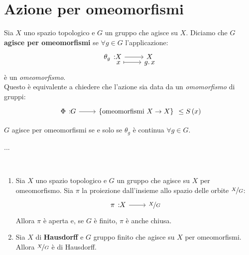 \section{Azione per omeomorfismi}
\begin{define}
Sia $X$ uno spazio topologico e $G$ un gruppo che agisce su $X$. Diciamo che $G$ \textbf{agisce per omeomorfismi} se $\forall g\in G$ l'applicazione:
\begin{equation}
\funztot{\theta_g}{X}{X}{x}{g\ldotp x}
\end{equation}
è un \textit{omeomorfismo}.\\
Questo è equivalente a chiedere che l'azione sia data da un \textit{omomorfismo} di gruppi:
\begin{equation}
\funz{\Phi}{G}{\left\{\text{omeomorfismi } X\rightarrow X\right\}}\leq S\left(x\right)
\end{equation}
\end{define}
\begin{exercise}
 $G$ agisce per omeomorfismi se e solo se $\theta_g$ è continua $\forall g\in G$.
\end{exercise}
\begin{demonstration}
	...
\end{demonstration}
\begin{proposition}~{}
\begin{enumerate}
\item Sia $X$ uno spazio topologico e $G$ un gruppo che agisce su $X$ per omeomorfismo. Sia $\pi$ la proiezione dall'insieme allo spazio delle orbite $\nicefrac{X}{G}$:
	\begin{equation}
		\funz{\pi}{X}{\nicefrac{X}{G}}
	\end{equation}
Allora $\pi$ è aperta e, se $G$ è finito, $\pi$ è anche chiusa.
\item Sia $X$ di \textbf{Hausdorff} e $G$ gruppo finito che agisce su $X$ per omeomorfismi. Allora $\nicefrac{X}{G}$ è di Hausdorff.
\end{enumerate}
\end{proposition}
